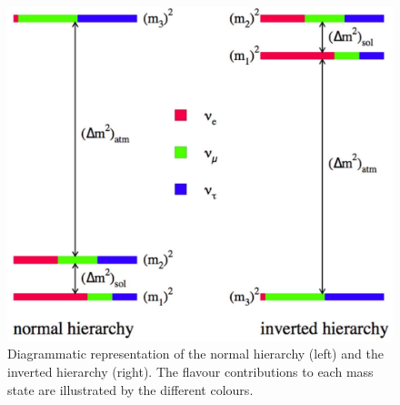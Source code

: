 \begin{figure}
    \centering
    \includegraphics[width = \largefigwidth]{figures-chap2/mass_hierarchy.jpg}
    \caption[Neutrino hierarchy.]{Diagrammatic representation of the normal hierarchy (left) and the inverted hierarchy (right). The flavour contributions to each mass state are illustrated by the different colours.}
    \label{fig:my_label}
\end{figure}

